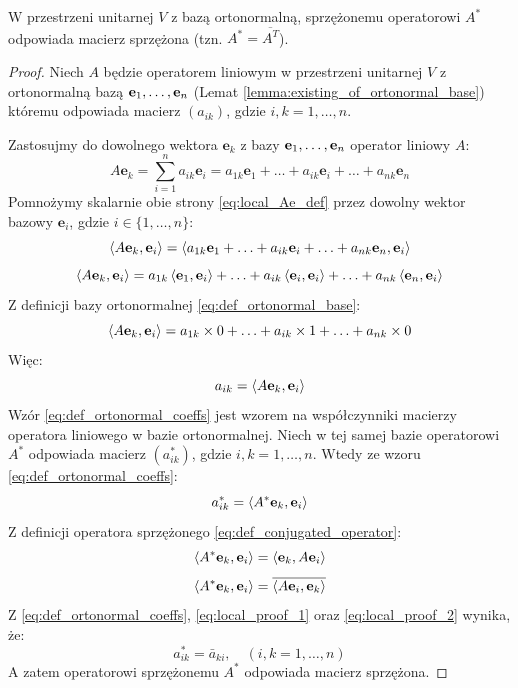 \begin{theorem}
    W przestrzeni unitarnej $V$ z bazą ortonormalną, sprzężonemu operatorowi $A^*$ odpowiada macierz sprzężona (tzn. $A^* = \overline{A^T}$).
\end{theorem}
\begin{proof}
    Niech $A$ będzie operatorem liniowym w przestrzeni unitarnej $V$ z  ortonormalną bazą $\mathbf{e}_1, \ldots, \mathbf{e}_n$ (Lemat \ref{lemma:existing_of_ortonormal_base}) któremu odpowiada macierz $(a_{ik})$, gdzie $i, k = 1, \ldots, n$.

    Zastosujmy do dowolnego wektora $\mathbf{e}_k$ z bazy $\mathbf{e}_1, \ldots, \mathbf{e}_n$ operator liniowy $A$:
    \begin{equation}\label{eq:local_Ae_def}
        A\mathbf{e}_k = \sum_{i=1}^{n}{a_{ik}\mathbf{e}_i} = a_{1k}\mathbf{e}_1 + \ldots + a_{ik}\mathbf{e}_i + \ldots + a_{nk}\mathbf{e}_n
    \end{equation}
    Pomnożymy skalarnie obie strony \eqref{eq:local_Ae_def} przez dowolny wektor bazowy $\mathbf{e}_i$, gdzie $i \in \{1, \ldots, n\}$:
    $$\left\langle A\mathbf{e}_k, \mathbf{e}_i \right\rangle = \left\langle 
        a_{1k}\mathbf{e}_1 + \ldots + a_{ik}\mathbf{e}_i + \ldots + a_{nk}\mathbf{e}_n
    , \mathbf{e}_i \right\rangle$$
    $$\left\langle A\mathbf{e}_k, \mathbf{e}_i \right\rangle = a_{1k}\left\langle \mathbf{e}_1, \mathbf{e}_i \right\rangle + \ldots + a_{ik}\left\langle \mathbf{e}_i, \mathbf{e}_i \right\rangle + \ldots + a_{nk}\left\langle \mathbf{e}_n, \mathbf{e}_i \right\rangle$$
    Z definicji bazy ortonormalnej \eqref{eq:def_ortonormal_base}:
    $$\left\langle A\mathbf{e}_k, \mathbf{e}_i \right\rangle = a_{1k} \times 0 + \ldots + a_{ik}\times 1 + \ldots + a_{nk} \times 0$$
    Więc:
    \begin{equation}\label{eq:def_ortonormal_coeffs}
        a_{ik} = \left\langle A\mathbf{e}_k, \mathbf{e}_i \right\rangle
    \end{equation}
    Wzór \eqref{eq:def_ortonormal_coeffs} jest wzorem na współczynniki macierzy operatora liniowego w bazie ortonormalnej.
    Niech w tej samej bazie operatorowi $A^*$ odpowiada macierz $(a^*_{ik})$, gdzie $i, k = 1, \ldots, n$.
    Wtedy ze wzoru \eqref{eq:def_ortonormal_coeffs}:
    \begin{equation}\label{eq:local_proof_1}
        a^*_{ik} = \left\langle A^*\mathbf{e}_k, \mathbf{e}_i \right\rangle
    \end{equation}
    Z definicji operatora sprzężonego \eqref{eq:def_conjugated_operator}:
    $$\left\langle A^*\mathbf{e}_k, \mathbf{e}_i \right\rangle = \left\langle \mathbf{e}_k, A\mathbf{e}_i \right\rangle$$
    \begin{equation}\label{eq:local_proof_2}
        \left\langle A^*\mathbf{e}_k, \mathbf{e}_i \right\rangle = \overline{\left\langle A\mathbf{e}_i, \mathbf{e}_k \right\rangle}
    \end{equation}
    Z \eqref{eq:def_ortonormal_coeffs}, \eqref{eq:local_proof_1} oraz \eqref{eq:local_proof_2} wynika, że:
    $$a^*_{ik} = \bar{a}_{ki}, \quad (i, k = 1, \ldots, n)$$
    A zatem operatorowi sprzężonemu $A^*$ odpowiada macierz sprzężona.
\end{proof}

